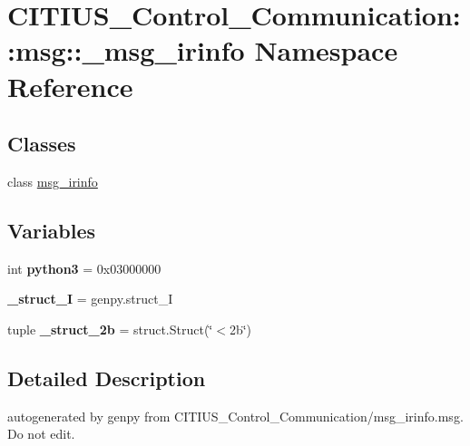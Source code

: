 \hypertarget{namespace_c_i_t_i_u_s___control___communication_1_1msg_1_1__msg__irinfo}{\section{\-C\-I\-T\-I\-U\-S\-\_\-\-Control\-\_\-\-Communication\-:\-:msg\-:\-:\-\_\-msg\-\_\-irinfo \-Namespace \-Reference}
\label{namespace_c_i_t_i_u_s___control___communication_1_1msg_1_1__msg__irinfo}
}
\subsection*{\-Classes}
\begin{DoxyCompactItemize}
\item 
class \hyperlink{class_c_i_t_i_u_s___control___communication_1_1msg_1_1__msg__irinfo_1_1msg__irinfo}{msg\-\_\-irinfo}
\end{DoxyCompactItemize}
\subsection*{\-Variables}
\begin{DoxyCompactItemize}
\item 
\hypertarget{namespace_c_i_t_i_u_s___control___communication_1_1msg_1_1__msg__irinfo_a851d2057c53a27498ff78e5a694f2c49}{int {\bfseries python3} = 0x03000000}\label{namespace_c_i_t_i_u_s___control___communication_1_1msg_1_1__msg__irinfo_a851d2057c53a27498ff78e5a694f2c49}

\item 
\hypertarget{namespace_c_i_t_i_u_s___control___communication_1_1msg_1_1__msg__irinfo_aa44a98509204c61d0d4eb3e7500309f7}{{\bfseries \-\_\-struct\-\_\-\-I} = genpy.\-struct\-\_\-\-I}\label{namespace_c_i_t_i_u_s___control___communication_1_1msg_1_1__msg__irinfo_aa44a98509204c61d0d4eb3e7500309f7}

\item 
\hypertarget{namespace_c_i_t_i_u_s___control___communication_1_1msg_1_1__msg__irinfo_af963c1d48c91ee88368c65fdfb80e735}{tuple {\bfseries \-\_\-struct\-\_\-2b} = struct.\-Struct(\char`\"{}$<$2b\char`\"{})}\label{namespace_c_i_t_i_u_s___control___communication_1_1msg_1_1__msg__irinfo_af963c1d48c91ee88368c65fdfb80e735}

\end{DoxyCompactItemize}


\subsection{\-Detailed \-Description}
\begin{DoxyVerb}autogenerated by genpy from CITIUS_Control_Communication/msg_irinfo.msg. Do not edit.\end{DoxyVerb}
 